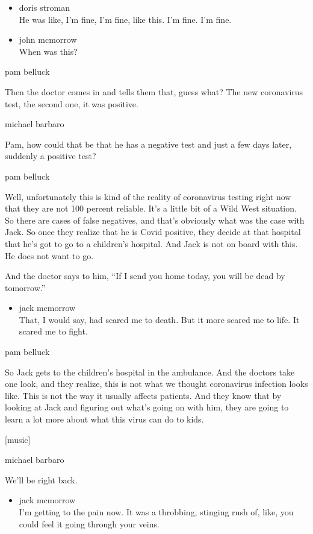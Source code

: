 \begin{itemize}
\item
  doris stroman\\
  He was like, I'm fine, I'm fine, like this. I'm fine. I'm fine.
\item
  john mcmorrow\\
  When was this?
\end{itemize}

pam belluck

Then the doctor comes in and tells them that, guess what? The new
coronavirus test, the second one, it was positive.

michael barbaro

Pam, how could that be that he has a negative test and just a few days
later, suddenly a positive test?

pam belluck

Well, unfortunately this is kind of the reality of coronavirus testing
right now that they are not 100 percent reliable. It's a little bit of a
Wild West situation. So there are cases of false negatives, and that's
obviously what was the case with Jack. So once they realize that he is
Covid positive, they decide at that hospital that he's got to go to a
children's hospital. And Jack is not on board with this. He does not
want to go.

And the doctor says to him, ``If I send you home today, you will be dead
by tomorrow.''

\begin{itemize}
\tightlist
\item
  jack mcmorrow\\
  That, I would say, had scared me to death. But it more scared me to
  life. It scared me to fight.
\end{itemize}

pam belluck

So Jack gets to the children's hospital in the ambulance. And the
doctors take one look, and they realize, this is not what we thought
coronavirus infection looks like. This is not the way it usually affects
patients. And they know that by looking at Jack and figuring out what's
going on with him, they are going to learn a lot more about what this
virus can do to kids.

{[}music{]}

michael barbaro

We'll be right back.

\begin{itemize}
\tightlist
\item
  jack mcmorrow\\
  I'm getting to the pain now. It was a throbbing, stinging rush of,
  like, you could feel it going through your veins.
\end{itemize}

